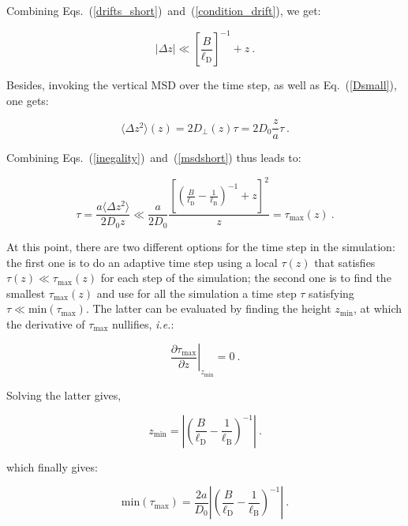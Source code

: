 Combining Eqs.~(\ref{drifts_short})~and~(\ref{condition_drift}), we get:

\begin{equation}
	|\Delta z |\ll \left[\frac{B}{\ell_{\mathrm{D}}}\right]^{-1} + z ~.
	\label{inegality}
\end{equation}


Besides, invoking the vertical \gls{MSD} over the time step, as well as Eq.~(\ref{Dsmall}), one gets:

\begin{equation}
	\langle \Delta z ^2 \rangle (z) = 2 D_\bot (z) \tau = 2D_0 \frac{z}{a}\tau ~.
	\label{msdshort}
\end{equation}

Combining Eqs.~(\ref{inegality})~and~(\ref{msdshort}) thus leads to:

\begin{equation}
	\tau = \frac{a\langle \Delta z ^2 \rangle }{2 D_0 z} \ll \frac{a}{2 D_0 } \frac{\left[\left(\frac{B}{\ell_\mathrm{D}} - \frac{1}{\ell_{\mathrm{B}}}\right)^{-1} + z\right] ^2}{z} = \tau_\mathrm{max} (z)~.
	\label{taumax}
\end{equation}

 At this point, there are two different options for the time step in the simulation: the first one is to do an adaptive time step using a local $\tau(z)$ that satisfies $\tau(z) \ll \tau_{\textrm{max}}(z)$ for each step of the simulation; the second one is to find the smallest $\tau_\mathrm{max}(z)$ and use for all the simulation a time step $\tau$ satisfying $\tau \ll \mathrm{min}(\tau_\mathrm{max}) $. The latter can be evaluated by finding the height $z_\mathrm{min}$, at which the derivative of $ \tau_\mathrm{max}$ nullifies, \textit{i.e.}:

\begin{equation}
	\left. \frac{\partial \tau_\mathrm{max}}{\partial z} \right| _{z_\mathrm{min} }= 0 ~.
\end{equation} 

Solving the latter gives,

\begin{equation}
	z_\mathrm{min} = \left| \left( \frac{B}{\ell_\mathrm{D}} - \frac{1}{\ell_{\mathrm{B}}}\right)^{-1} \right|~.
\end{equation}


which finally gives:

\begin{equation}
	\mathrm{min}(\tau_\mathrm{max}) =  \frac{2 a}{D_0}  \left| \left( \frac{B}{\ell_\mathrm{D}} - \frac{1}{\ell_{\mathrm{B}}}\right)^{-1} \right| ~.
\end{equation}

